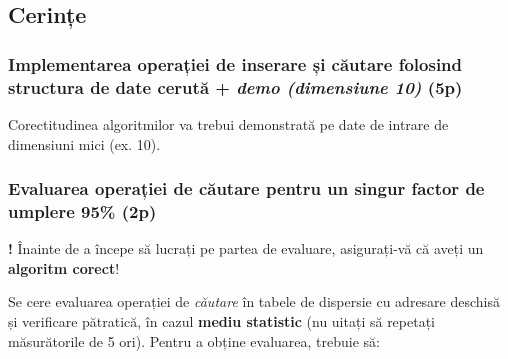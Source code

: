 \documentclass[../ro-fa-lab.tex]{subfiles}
\begin{document}
\subsection{Cerințe}\label{cerinux21be}

\subsubsection{\texorpdfstring{Implementarea operației de inserare și
căutare folosind structura de date cerută + \emph{demo (dimensiune 10)}
(5p)}{Implementarea operației de inserare și căutare folosind structura de date cerută + demo (dimensiune 10) (5p)}}\label{implementarea-operaux21biei-de-inserare-ux219i-cux103utare-folosind-structura-de-date-cerutux103-demo-dimensiune-10-5p}

Corectitudinea algoritmilor va trebui demonstrată pe date de intrare de
dimensiuni mici (ex. 10).

\subsubsection{Evaluarea operației de căutare pentru un singur factor de
umplere 95\%
(2p)}\label{evaluarea-operaux21biei-de-cux103utare-pentru-un-singur-factor-de-umplere-95-2p}

\textbf{!} Înainte de a începe să lucrați pe partea de evaluare,
asigurați-vă că aveți un \textbf{algoritm corect}!

Se cere evaluarea operației de \emph{căutare} în tabele de dispersie cu
adresare deschisă și verificare pătratică, în cazul \textbf{mediu
statistic} (nu uitați să repetați măsurătorile de 5 ori). Pentru a
obține evaluarea, trebuie să:
\end{document}
